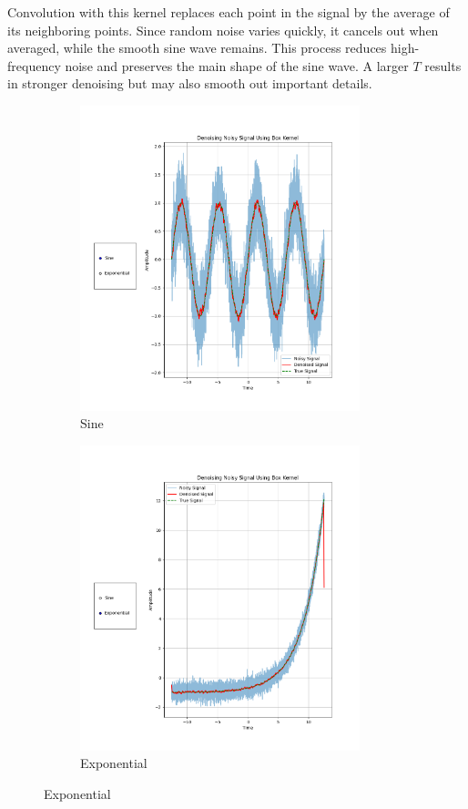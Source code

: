 \documentclass[12pt,a4paper]{report}
\begin{document}
Convolution with this kernel replaces each point in the signal by the average of its neighboring points. Since random noise varies quickly, it cancels out when averaged, while the smooth sine wave remains. This process reduces high-frequency noise and preserves the main shape of the sine wave. A larger \( T \) results in stronger denoising but may also smooth out important details.

\begin{figure}[h!]
	\begin{subfigure}[b]{100pt}
		\caption{Sine}
		\includegraphics[width = 230pt]{figs/sine_denoise.png}
	\end{subfigure}
	\hspace{110pt}
	\begin{subfigure}[b]{100pt}
		\caption{Exponential}
		\includegraphics[width = 230pt]{figs/exp_denoise.png}
	\end{subfigure}
\end{figure}
\end{document}
